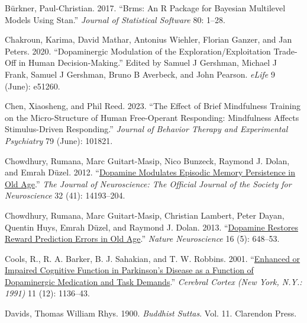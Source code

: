 \documentclass{article}
\newlength{\cslhangindent}
\newlength{\cslentryspacingunit} %
\newenvironment{CSLReferences}[2] %
 {%
  \setlength{\parindent}{0pt}
  \ifodd #1
  \let\oldpar\par
  \def\par{\hangindent=\cslhangindent\oldpar}
  \fi
  \setlength{\parskip}{#2\cslentryspacingunit}
 }%
 {}
\begin{document}
\begin{CSLReferences}{1}{0}
\leavevmode{}%
Bürkner, Paul-Christian. 2017. {``Brms: {An R} Package for {Bayesian}
Multilevel Models Using {Stan}.''} \emph{Journal of Statistical
Software} 80: 1--28.

\leavevmode{}%
Chakroun, Karima, David Mathar, Antonius Wiehler, Florian Ganzer, and
Jan Peters. 2020. {``Dopaminergic Modulation of the
Exploration/Exploitation Trade-Off in Human Decision-Making.''} Edited
by Samuel J Gershman, Michael J Frank, Samuel J Gershman, Bruno B
Averbeck, and John Pearson. \emph{eLife} 9 (June): e51260.

\leavevmode{}%
Chen, Xiaosheng, and Phil Reed. 2023. {``The Effect of Brief Mindfulness
Training on the Micro-Structure of Human Free-Operant Responding:
{Mindfulness} Affects Stimulus-Driven Responding.''} \emph{Journal of
Behavior Therapy and Experimental Psychiatry} 79 (June): 101821.

\leavevmode{}%
Chowdhury, Rumana, Marc Guitart-Masip, Nico Bunzeck, Raymond J. Dolan,
and Emrah Düzel. 2012.
{``\href{https://www.ncbi.nlm.nih.gov/pmc/articles/PMC3734374}{Dopamine
Modulates Episodic Memory Persistence in Old Age}.''} \emph{The Journal
of Neuroscience: The Official Journal of the Society for Neuroscience}
32 (41): 14193--204.

\leavevmode{}%
Chowdhury, Rumana, Marc Guitart-Masip, Christian Lambert, Peter Dayan,
Quentin Huys, Emrah Düzel, and Raymond J. Dolan. 2013.
{``\href{https://www.ncbi.nlm.nih.gov/pmc/articles/PMC3672991}{Dopamine
Restores Reward Prediction Errors in Old Age}.''} \emph{Nature
Neuroscience} 16 (5): 648--53.

\leavevmode{}%
Cools, R., R. A. Barker, B. J. Sahakian, and T. W. Robbins. 2001.
{``\href{https://www.ncbi.nlm.nih.gov/pubmed/11709484}{Enhanced or
Impaired Cognitive Function in {Parkinson}'s Disease as a Function of
Dopaminergic Medication and Task Demands}.''} \emph{Cerebral Cortex (New
York, N.Y.: 1991)} 11 (12): 1136--43.

\leavevmode{}%
Davids, Thomas William Rhys. 1900. \emph{Buddhist Suttas}. Vol. 11.
{Clarendon Press}.


\end{CSLReferences}
\end{document}
